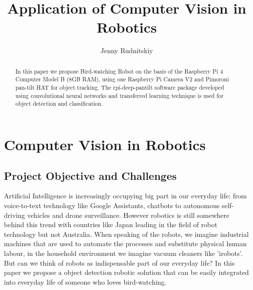 \documentclass[runningheads]{llncs}
\begin{document}
%
\title{Application of Computer Vision in Robotics}
%
%
\author{Jenny Rudnitskiy}
%
%
%
\maketitle              %
%
\begin{abstract}
In this paper we propose Bird-watching Robot on the basis of the Raspberry Pi 4 Computer Model B (8GB RAM), using one Raspberry Pi Camera V2 and Pimoroni pan-tilt HAT for object tracking. The rpi-deep-pantilt software package developed using convolutional neural networks and transferred learning technique is used for object detection and classification.  


\end{abstract}
%
%
%
\section{Computer Vision in Robotics}
\subsection{Project Objective and Challenges}
Artificial Intelligence is increasingly occupying big part in our everyday life: from voice-to-text technology like Google Assistants, chatbots to autonomous self-driving vehicles and drone surveillance. However robotics is still somewhere behind this trend with countries like Japan leading in the field of robot technology but not Australia. When speaking of the robots, we imagine industrial machines that are used to automate the processes and substitute physical human labour, in the household environment we imagine vacuum cleaners like 'irobots'. But can we think of robots as indispensable part of our everyday life? In this paper we propose a object detection robotic solution that can be easily integrated into everyday life of someone who loves bird-watching.
\end{document}
